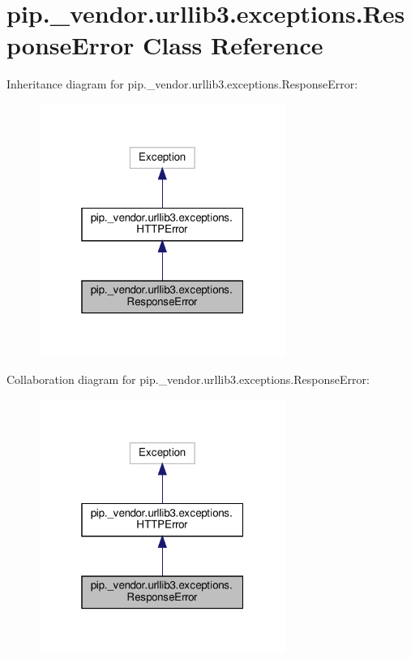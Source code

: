 \hypertarget{classpip_1_1__vendor_1_1urllib3_1_1exceptions_1_1ResponseError}{}\section{pip.\+\_\+vendor.\+urllib3.\+exceptions.\+Response\+Error Class Reference}
\label{classpip_1_1__vendor_1_1urllib3_1_1exceptions_1_1ResponseError}


Inheritance diagram for pip.\+\_\+vendor.\+urllib3.\+exceptions.\+Response\+Error\+:
\nopagebreak
\begin{figure}[H]
\begin{center}
\leavevmode
\includegraphics[width=229pt]{classpip_1_1__vendor_1_1urllib3_1_1exceptions_1_1ResponseError__inherit__graph}
\end{center}
\end{figure}


Collaboration diagram for pip.\+\_\+vendor.\+urllib3.\+exceptions.\+Response\+Error\+:
\nopagebreak
\begin{figure}[H]
\begin{center}
\leavevmode
\includegraphics[width=229pt]{classpip_1_1__vendor_1_1urllib3_1_1exceptions_1_1ResponseError__coll__graph}
\end{center}
\end{figure}
